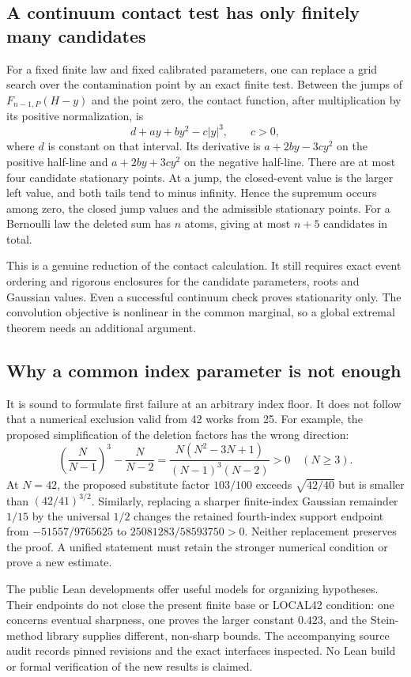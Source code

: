 \subsection{A continuum contact test has only finitely many candidates}
For a fixed finite law and fixed calibrated parameters, one can replace
a grid search over the contamination point by an exact finite test.
Between the jumps of $F_{n-1,P}(H-y)$ and the point zero, the contact
function, after multiplication by its positive normalization, is
\[
 d+ay+by^2-c|y|^3,\qquad c>0,
\]
where $d$ is constant on that interval. Its derivative is
$a+2by-3cy^2$ on the positive half-line and $a+2by+3cy^2$ on the
negative half-line. There are at most four candidate stationary points.
At a jump, the closed-event value is the larger left value, and both
tails tend to minus infinity. Hence the supremum occurs among zero,
the closed jump values and the admissible stationary points. For a
Bernoulli law the deleted sum has $n$ atoms, giving at most $n+5$
candidates in total.

This is a genuine reduction of the contact calculation. It still requires
exact event ordering and rigorous enclosures for the candidate parameters,
roots and Gaussian values. Even a successful continuum check proves
stationarity only. The convolution objective is nonlinear in the common
marginal, so a global extremal theorem needs an additional argument.

\subsection{Why a common index parameter is not enough}
It is sound to formulate first failure at an arbitrary index floor.
It does not follow that a numerical exclusion valid from 42 works from 25.
For example, the proposed simplification of the deletion factors has
the wrong direction:
\[
 \left(\frac N{N-1}\right)^3-\frac N{N-2}
 =\frac{N(N^2-3N+1)}{(N-1)^3(N-2)}>0\quad(N\ge3).
\]
At $N=42$, the proposed substitute factor $103/100$ exceeds
$\sqrt{42/40}$ but is smaller than $(42/41)^{3/2}$.
Similarly, replacing a sharper finite-index Gaussian remainder $1/15$
by the universal $1/2$ changes the retained fourth-index support endpoint
from $-51557/9765625$ to $25081283/58593750>0$.
Neither replacement preserves the proof. A unified statement must retain
the stronger numerical condition or prove a new estimate.

The public Lean developments offer useful models for organizing hypotheses.
Their endpoints do not close the present finite base or LOCAL42 condition:
one concerns eventual sharpness, one proves the larger constant $0.423$,
and the Stein-method library supplies different, non-sharp bounds.
The accompanying source audit records pinned revisions and the exact
interfaces inspected. No Lean build or formal verification of the new
results is claimed.
